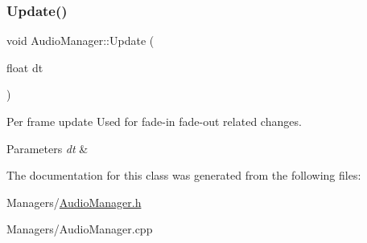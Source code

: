 \subsubsection{\texorpdfstring{Update()}{Update()}}
{\footnotesize\ttfamily void Audio\+Manager\+::\+Update (\begin{DoxyParamCaption}\item[{float}]{dt }\end{DoxyParamCaption})}



Per frame update Used for fade-\/in fade-\/out related changes. 


\begin{DoxyParams}{Parameters}
{\em dt} & \\
\hline
\end{DoxyParams}


The documentation for this class was generated from the following files\+:\begin{DoxyCompactItemize}
\item 
Managers/\hyperlink{AudioManager_8h}{Audio\+Manager.\+h}\item 
Managers/Audio\+Manager.\+cpp\end{DoxyCompactItemize}
